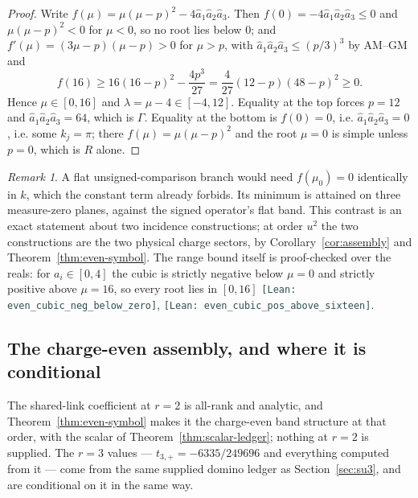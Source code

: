 \documentclass[11pt]{article}
\theoremstyle{plain}
\theoremstyle{definition}
\theoremstyle{remark}
\newtheorem{remark}[theorem]{Remark}
\newcommand{\chk}[1]{}
\newcommand{\leanref}[1]{{\footnotesize\textcolor{DarkSlateGray}{\texttt{[Lean: #1]}}}}
\begin{document}
\begin{proof}
Write $f(\mu)=\mu(\mu-p)^2-4\hat a_1\hat a_2\hat a_3$. Then
$f(0)=-4\hat a_1\hat a_2\hat a_3\le0$ and $\mu(\mu-p)^2<0$ for $\mu<0$, so no
root lies below $0$; and $f'(\mu)=(3\mu-p)(\mu-p)>0$ for $\mu>p$, with
$\hat a_1\hat a_2\hat a_3\le(p/3)^3$ by AM--GM and
\[
 f(16)\ge16(16-p)^2-\frac{4p^3}{27}
 =\frac4{27}(12-p)(48-p)^2\ge0.
\]
Hence $\mu\in[0,16]$ and
$\lambda=\mu-4\in[-4,12]$. Equality at the top forces $p=12$ and
$\hat a_1\hat a_2\hat a_3=64$, which is $\Gamma$. Equality at the bottom is
$f(0)=0$, i.e. $\hat a_1\hat a_2\hat a_3=0$, i.e. some $k_j=\pi$; there
$f(\mu)=\mu(\mu-p)^2$ and the root $\mu=0$ is simple unless $p=0$, which is
$R$ alone.
\end{proof}
\chk{the C-even range [-4, 12] is exact; the top only at Gamma, the floor on three planes}
\chk{the C-even band touches its floor exactly on the three planes k\_j = pi}

\begin{remark}
A flat unsigned-comparison branch would need $f(\mu_0)=0$ identically in $k$,
which the constant term already forbids. Its minimum is attained on three
measure-zero planes, against the signed operator's flat band. This contrast is
an exact statement about two incidence constructions; at order $u^2$ the two
constructions are the two physical charge sectors, by
Corollary~\ref{cor:assembly} and Theorem~\ref{thm:even-symbol}. The range
bound itself is proof-checked over the reals: for $a_i\in[0,4]$ the cubic is
strictly negative below $\mu=0$ and strictly positive above $\mu=16$, so
every root lies in $[0,16]$ \leanref{even\_cubic\_neg\_below\_zero},
\leanref{even\_cubic\_pos\_above\_sixteen}.
\chk{the C-even band touches its floor exactly on the three planes k\_j = pi}
\chk{the C-even spectra at the four high-symmetry momenta}
\end{remark}

\subsection{The charge-even assembly, and where it is conditional}

The shared-link coefficient at $r=2$ is all-rank and analytic, and
Theorem~\ref{thm:even-symbol} makes it the charge-even band structure at that
order, with the scalar of Theorem~\ref{thm:scalar-ledger}; nothing at $r=2$
is supplied. The $r=3$ values --- $t_{3,+}=-6335/249696$ and everything
computed from it --- come from the same supplied domino ledger as
Section~\ref{sec:su3}, and are conditional on it in the same way.
\end{document}
